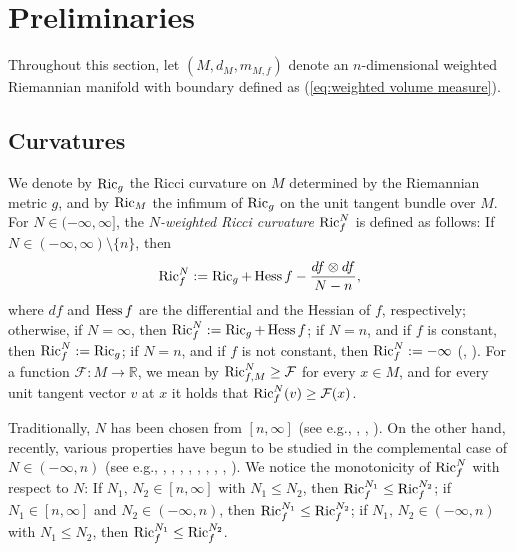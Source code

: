 \section{Preliminaries}\label{sec:Preliminaries}
Throughout this section,
let $(M,d_{M},m_{M,f})$ denote an $n$-dimensional weighted Riemannian manifold with boundary defined as (\ref{eq:weighted volume measure}). 

\subsection{Curvatures}\label{sec:Curvatures}
We denote by $\operatorname{Ric}_{g}$ the Ricci curvature on $M$ determined by the Riemannian metric $g$,
and by $\operatorname{Ric}_{M}$ the infimum of $\operatorname{Ric}_{g}$ on the unit tangent bundle over $M$.
For $N\in (-\infty,\infty]$,
the \textit{$N$-weighted Ricci curvature} $\operatorname{Ric}^{N}_{f}$ is defined as follows:
If $N \in (-\infty,\infty)\setminus \{n\}$,
then
\begin{equation*}
\operatorname{Ric}^{N}_{f}:=\operatorname{Ric}_{g}+\operatorname{Hess} f-\frac{d f \otimes d f}{N-n},
\end{equation*}
where $d f$ and $\operatorname{Hess} f$ are the differential and the Hessian of $f$,
respectively;
otherwise,
if $N=\infty$,
then $\operatorname{Ric}^{N}_{f}:=\operatorname{Ric}_{g}+\operatorname{Hess} f$;
if $N=n$,
and if $f$ is constant,
then $\operatorname{Ric}^{N}_{f}:=\operatorname{Ric}_{g}$;
if $N=n$,
and if $f$ is not constant,
then $\operatorname{Ric}^{N}_{f}:=-\infty$ (\cite{BE}, \cite{L}).
For a function $\mathcal{F}:M\to \mathbb{R}$,
we mean by $\operatorname{Ric}^{N}_{f,M}\geq \mathcal{F}$ for every $x \in M$,
and for every unit tangent vector $v$ at $x$
it holds that $\operatorname{Ric}^{N}_{f}(v)\geq \mathcal{F}(x)$.

\begin{rem}\label{rem:monotonicity of weighted Ricci curvature}
Traditionally,
$N$ has been chosen from $[n,\infty]$ (see e.g., \cite{Lo}, \cite{Q}, \cite{WW}).
On the other hand,
recently,
various properties have begun to be studied in the complemental case of $N \in (-\infty,n)$ (see e.g., \cite{K}, \cite{KM}, \cite{Mi4}, \cite{O1}, \cite{O2}, \cite{OT1}, \cite{OT2}, \cite{W}, \cite{WY}).
We notice the monotonicity of $\operatorname{Ric}^{N}_{f}$ with respect to $N$:
If $N_{1},\,N_{2} \in [n,\infty]$ with $N_{1}\leq N_{2}$,
then $\operatorname{Ric}^{N_{1}}_{f} \leq \operatorname{Ric}^{N_{2}}_{f}$;
if $N_{1} \in [n,\infty]$ and $N_{2} \in (-\infty,n)$,
then $\operatorname{Ric}^{N_{1}}_{f} \leq \operatorname{Ric}^{N_{2}}_{f}$;
if $N_{1},\,N_{2} \in (-\infty,n)$ with $N_{1}\leq N_{2}$,
then $\operatorname{Ric}^{N_{1}}_{f} \leq \operatorname{Ric}^{N_{2}}_{f}$.
\end{rem}

